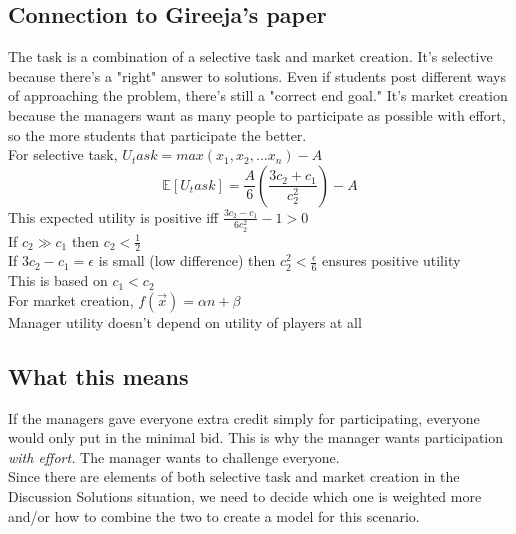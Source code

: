 \documentclass[leqno]{article}
\begin{document}
\subsection{Connection to Gireeja's paper}
The task is a combination of a selective task and market creation. It's selective because there's a "right" answer to solutions. Even if students post different ways of approaching the problem, there's still a "correct end goal." It's market creation because the managers want as many people to participate as possible with effort, so the more students that participate the better.\\

For selective task, $U_task = max(x_1,x_2,\dots x_n) - A$
\[ \mathbb{E}[U_task] = \frac{A}{6}\left(\frac{3c_2+c_1}{c_2^2}\right) - A \]
This expected utility is positive iff $\frac{3c_2-c_1}{6c_2^2} - 1 > 0$\\
If $c_2 \gg c_1$ then $c_2 < \frac{1}{2}$\\
If $3c_2-c_1 = \epsilon$ is small (low difference) then $c_2^2 < \frac{\epsilon}{6}$ ensures positive utility\\
This is based on $c_1 < c_2$\\

For market creation, $f(\overrightarrow{x}) = \alpha n + \beta$\\
Manager utility doesn't depend on utility of players at all

\subsection{What this means}
If the managers gave everyone extra credit simply for participating, everyone would only put in the minimal bid. This is why the manager wants participation \emph{with effort.} The manager wants to challenge everyone.\\

Since there are elements of both selective task and market creation in the Discussion Solutions situation, we need to decide which one is weighted more and/or how to combine the two to create a model for this scenario.
\end{document}
